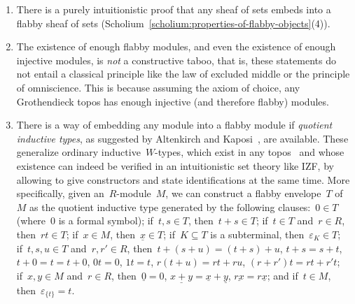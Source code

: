 \documentclass[oneside]{amsart}
\theoremstyle{definition}
\theoremstyle{plain}
\theoremstyle{remark}
\renewcommand{\_}{\mathpunct{.}\,}
\begin{document}
\begin{enumerate}
\item There is a purely intuitionistic proof that any sheaf of sets embeds into
a flabby sheaf of sets
(Scholium~\ref{scholium:properties-of-flabby-objects}(4)).

\item The existence of enough flabby modules, and even the existence of enough
injective modules, is \emph{not} a constructive taboo, that is, these statements do not
entail a classical principle like the law of excluded middle or the principle
of omniscience. This is because assuming the axiom of choice, any
Grothendieck topos has enough injective (and therefore flabby) modules. 


\item There is a way of embedding any module into a flabby module if
\emph{quotient inductive types}, as suggested by Altenkirch and
Kaposi~\cite{altenkirch-kaposi:qits}, are available. These generalize ordinary
inductive~$W$-types, which exist in any
topos~\cite{moerdijk-palmgren:wellfounded-trees,berg-moerdijk:w-types-in-sheaves,berg-kouwenhoven-gentil:w-types-in-eff}
and whose existence
can indeed be verified in an intuitionistic set theory like IZF, by allowing to
give constructors and state identifications at the same time. More
specifically, given an~$R$-module~$M$, we can construct a flabby envelope~$T$
of~$M$ as the quotient inductive type generated by the following clauses:~$0
\in T$ (where~$0$ is a formal symbol); if~$t,s \in T$, then~$t + s \in T$;
if~$t \in T$ and~$r \in R$, then~$rt \in T$; if~$x \in M$, then~$\underline{x}
\in T$; if~$K \subseteq T$ is a subterminal, then~$\varepsilon_K \in T$;
if~$t,s,u \in T$ and~$r,r' \in R$, then~$t + (s + u) = (t + s) + u$, $t + s = s + t$, $t + 0 = t
= t + 0$, $0t = 0$, $1t = t$, $r(t+u) = rt + ru$, $(r+r')t = rt + r't$; if~$x,y
\in M$ and~$r \in R$, then~$\underline{0} = 0$, $\underline{x + y} =
\underline{x} + \underline{y}$, $\underline{rx} = r \underline{x}$; and if~$t
\in M$, then~$\varepsilon_{\{t\}} = t$.


\end{enumerate}
\end{document}

